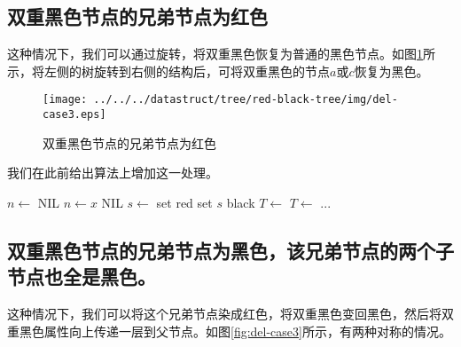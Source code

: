 \documentclass[UTF8]{article}
\begin{document}
\subsection{双重黑色节点的兄弟节点为红色}
这种情况下，我们可以通过旋转，将双重黑色恢复为普通的黑色节点。如图\ref{fig:del-case2}所示，将左侧的树旋转到右侧的结构后，可将双重黑色的节点$a$或$c$恢复为黑色。

\begin{figure}[htbp]
  \centering
  \texttt{[image: ../../../datastruct/tree/red-black-tree/img/del-case3.eps]}
  \caption{双重黑色节点的兄弟节点为红色} \label{fig:del-case2}
\end{figure}

我们在此前给出算法上增加这一处理。

\begin{algorithmic}[1]
  \State $n \gets$ NIL
    
    \State $n \gets x$
  \EndIf
   
    \State \Return NIL
  \EndIf
     
        \State $s \gets$ 
         
          \State set  red
          \State set $s$ black
           
            \State $T \gets$ 
          \Else {}
            \State $T \gets$ 
          \EndIf
          \State ...
        \EndIf
    \EndIf
  \EndWhile
\EndFunction
\end{algorithmic}

\subsection{双重黑色节点的兄弟节点为黑色，该兄弟节点的两个子节点也全是黑色。}
这种情况下，我们可以将这个兄弟节点染成红色，将双重黑色变回黑色，然后将双重黑色属性向上传递一层到父节点。如图\ref{fig:del-case3}所示，有两种对称的情况。
\end{document}
